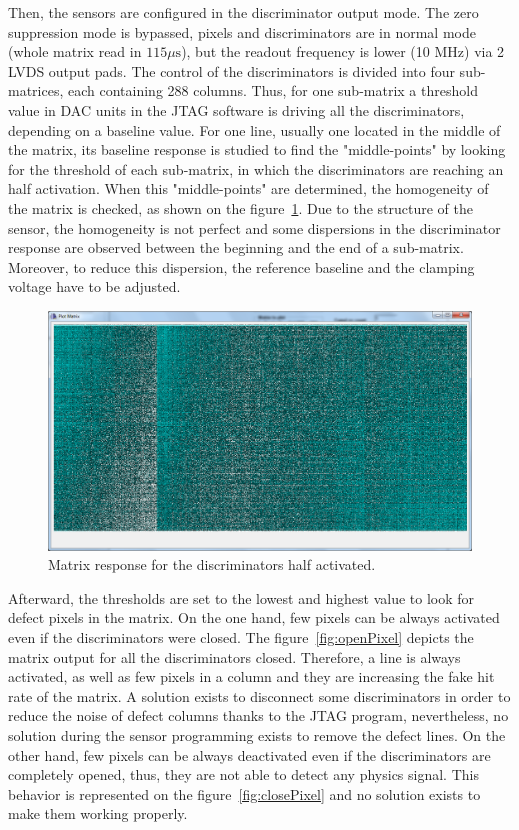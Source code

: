   Then, the sensors are configured in the discriminator output mode.
  The zero suppression mode is bypassed, pixels and discriminators are in normal mode (whole matrix read in $115\mu\text{s}$), but the readout frequency is lower (10 MHz) via 2 LVDS output pads.
  The control of the discriminators is divided into four sub-matrices, each containing 288 columns.
  Thus, for one sub-matrix a threshold value in DAC units in the JTAG software is driving all the discriminators, depending on a baseline value.
  For one line, usually one located in the middle of the matrix, its baseline response is studied to find the "middle-points" by looking for the threshold of each sub-matrix, in which the discriminators are reaching an half activation.
  When this "middle-points" are determined, the homogeneity of the matrix is checked, as shown on the figure~\ref{fig:homogeneityMi26}.
  Due to the structure of the sensor, the homogeneity is not perfect and some dispersions in the discriminator response are observed between the beginning and the end of a sub-matrix.
  Moreover, to reduce this dispersion, the reference baseline and the clamping voltage have to be adjusted.
  
  \begin{figure}[!h]
    \centering
    \includegraphics[width = \textwidth]{Pictures/labTests/discri_middle.png}
    \caption{Matrix response for the discriminators half activated.}
    \label{fig:homogeneityMi26}
  \end{figure}
  
  Afterward, the thresholds are set to the lowest and highest value to look for defect pixels in the matrix.
  On the one hand, few pixels can be always activated even if the discriminators were closed.
  The figure~\ref{fig:openPixel} depicts the matrix output for all the discriminators closed.
  Therefore, a line is always activated, as well as few pixels in a column and they are increasing the fake hit rate of the matrix.
  A solution exists to disconnect some discriminators in order to reduce the noise of defect columns thanks to the JTAG program, nevertheless, no solution during the sensor programming exists to remove the defect lines.
  On the other hand, few pixels can be always deactivated even if the discriminators are completely opened, thus, they are not able to detect any physics signal.
  This behavior is represented on the figure~\ref{fig:closePixel} and no solution exists to make them working properly.
   
